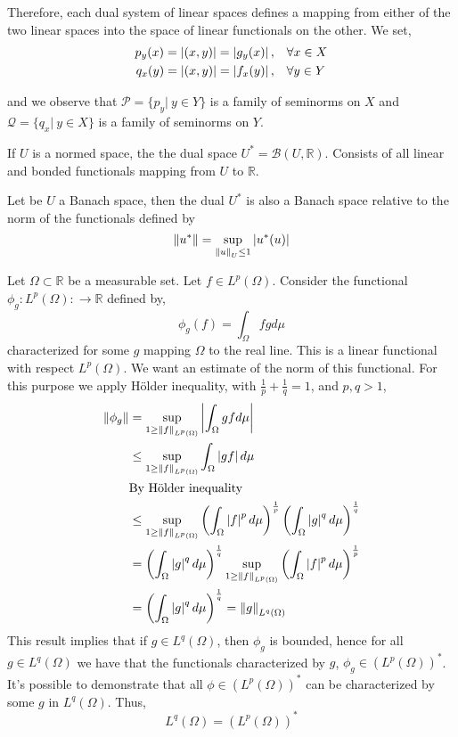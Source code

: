 Therefore, each dual system of linear spaces defines a mapping from either of the two linear spaces into the space of linear functionals on the other.
We set,
\begin{align*}
p_y(x)=\left|(x,y)\right|=\left|g_y(x)\right|, & \quad \forall x \in X \\	
q_x(y)=\left|(x,y)\right|=\left|f_x(y)\right|, & \quad \forall y \in Y
\end{align*}

and we observe that $\mathcal{P} = \{p_y | \ y \in Y \}$ is a family of seminorms on $X$ and $\mathcal{Q}=
\{q_x | \ y \in  X\} $ is a family of seminorms on $Y$. 



\begin{definition}
	If $U$ is a normed space, the the dual space $U^*=\mathcal{B}(U, \mathbb{R})$. Consists of all linear and bonded functionals mapping from $U$ to $\mathbb{R}$.
\end{definition}
\begin{theorem}
	Let be $U$ a Banach space, then the dual $U^*$ is also a Banach space relative to the norm of the functionals defined by \[\left\lVert u^*\right\rVert=\sup_{\left\lVert u\right\rVert_U\leq 1} \left|u^*(u)\right|\]
\end{theorem}
\begin{example}
	Let $\Omega \subset \mathbb{R}$ be a measurable set. Let $f \in L^p(\Omega)$. Consider the functional $\phi_g: L^p(\Omega):\rightarrow \mathbb{R}$ defined by,
	\[
		\phi_g (f) = \int_{\Omega} f g d\mu 
	\]
	characterized for some $g$ mapping $\Omega$ to the real line. This is a linear functional with respect $L^p(\Omega)$. We want an estimate of the norm of this functional. For this purpose we apply H\"older inequality, with $\frac{1}{p}+\frac{1}{q}=1$, and $p,q >1$,
	\begin{align*}
		\norm{\phi_g}&=\sup_{1\geq \norm{f}_{L^p(\Omega)}}\abs{\int_{\Omega} gf d\mu}\\
		&\leq 	\sup_{1\geq\norm{f}_{L^p(\Omega)}}\int_{\Omega} \abs{gf} d\mu\\
		&{\centering \text{By H\"older inequality}}\\
		&\leq	\sup_{1\geq\norm{f}_{L^p(\Omega)}}\left(\int_{\Omega} \abs{f}^p d\mu \right)^{\frac{1}{p}}\left(\int_{\Omega} \abs{g}^q d\mu \right)^{\frac{1}{q}}\\
		&=\left(\int_{\Omega} \abs{g}^q d\mu \right)^{\frac{1}{q}} \sup_{1\geq\norm{f}_{L^p(\Omega)}}\left(\int_{\Omega} \abs{f}^p d\mu \right)^{\frac{1}{p}} \\
		&=\left(\int_{\Omega} \abs{g}^q d\mu \right)^{\frac{1}{q}}=\norm{g}_{L^q(\Omega)}
	\end{align*}
	This result implies that if $g \in L^q(\Omega)$, then $\phi_g$ is bounded, hence for all $g\in L^q(\Omega)$ we have that the functionals characterized by $g$,  $\phi_g \in (L^p(\Omega))^*$. It's possible to demonstrate that all $ \phi \in (L^p(\Omega))^*$ can be characterized by some $g$ in $L^q(\Omega)$. Thus, \[L^q(\Omega)=(L^p(\Omega))^*\]
\end{example}

